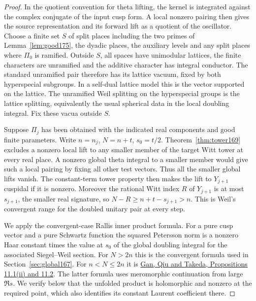\documentclass[a4paper,11pt]{article}
\theoremstyle{definition}
\theoremstyle{remark}
\numberwithin{equation}{section}
\begin{document}
\begin{proof}
In the quotient convention for theta lifting, the kernel
is integrated against the complex conjugate of the input
cusp form. A local nonzero pairing then gives the source
representation and its forward lift as a quotient of the
oscillator. Choose a finite set \(S\) of split places
including the two primes of Lemma~\ref{lem:good175}, the
dyadic places, the auxiliary levels and any split places
where \(\Pi_0\) is ramified. Outside \(S\), all spaces have
unimodular lattices, the finite characters are unramified
and the additive character has integral conductor. The
standard unramified pair therefore has its lattice vacuum,
fixed by both hyperspecial subgroups. In a self-dual lattice
model this is the vector supported on the lattice. The
unramified Weil splitting on the hyperspecial groups is the
lattice splitting, equivalently the usual spherical data in
the local doubling integral. Fix these vacua outside \(S\).

Suppose \(\Pi_j\) has been obtained with the indicated real
components and good finite parameters. Write \(n=n_j\),
\(N=n+t\), \(s_0=t/2\). Theorem~\ref{thm:tower169}
excludes a nonzero local lift to any smaller member of
the target Witt tower at every real place. A nonzero
global theta integral to a smaller member would give such
a local pairing by fixing all other test vectors. Thus all
the smaller global lifts vanish. The constant-term tower
property then makes the lift to \(Y_{j+1}\) cuspidal if it
is nonzero. Moreover the rational Witt index \(R\) of
\(Y_{j+1}\) is at most \(s_{j+1}\), the smaller real
signature, so \(N-R\ge n+t-s_{j+1}>n\). This is Weil's
convergent range for the doubled unitary pair at every step.

We apply the convergent-case Rallis inner product formula.
For a pure cusp vector and a pure Schwartz function the
squared Petersson norm is a nonzero Haar constant times
the value at \(s_0\) of the global doubling integral for
the associated Siegel--Weil section. For \(N>2n\) this
is the convergent formula used in Section~\ref{sec:global167}.
For \(n<N\le2n\) it is
\href{https://arxiv.org/pdf/1207.4709}{Gan, Qiu and Takeda,
Propositions 11.1(ii) and 11.2}. The latter formula uses
meromorphic continuation from large \(\Re s\). We verify
below that the unfolded product is holomorphic and nonzero
at the required point, which also identifies its constant
Laurent coefficient there.


\end{proof}
\end{document}
